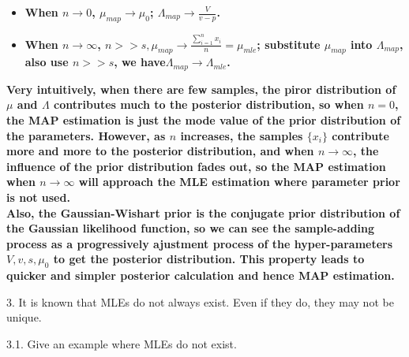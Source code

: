 \documentclass{article}
\theoremstyle{definition}
\theoremstyle{definition}
\theoremstyle{remark}
\begin{document}
\begin{addmargin}[3em]{2em}
  \begin{itemize}
  \item \textbf{When $n \rightarrow 0$, $\mu_{map} \rightarrow \mu_0$; $\Lambda_{map} \rightarrow \frac{V}{v-p}$.}
  \item \textbf{When $n \rightarrow \infty$, $n >> s, \mu_{map} \rightarrow \frac{\sum_{i=1}^n x_i}{n} = \mu_{mle}$; substitute $\mu_{map}$ into $\Lambda_{map}$, also use $n>>s$, we have$\Lambda_{map} \rightarrow \Lambda_{mle}$.}
  \end{itemize}
  \textbf{Very intuitively, when there are few samples, the piror distribution of $\mu$ and $\Lambda$ contributes much to the posterior distribution, so when $n = 0$, the MAP estimation is just the mode value of the prior distribution of the parameters. However, as $n$ increases, the samples $\{x_i\}$ contribute more and more to the posterior distribution, and when $n \rightarrow \infty$, the influence of the prior distribution fades out, so the MAP estimation when $n \rightarrow \infty$ will approach the MLE estimation where parameter prior is not used.}\\

  \textbf{Also, the Gaussian-Wishart prior is the conjugate prior distribution of the Gaussian likelihood function, so we can see the sample-adding process as a progressively ajustment process of the hyper-parameters $V, v, s, \mu_0$ to get the posterior distribution. This property leads to quicker and simpler posterior calculation and hence MAP estimation.}
\end{addmargin}

3. It is known that MLEs do not always exist. Even if they do, they may not be unique.

3.1. Give an example where MLEs do not exist.
\end{document}
